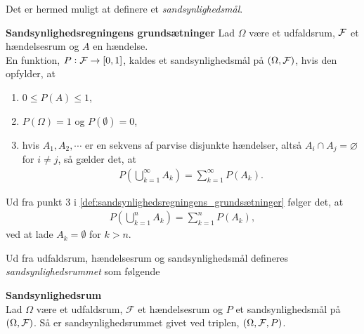 Det er hermed muligt at definere et \textit{sandsynlighedsmål}.

\begin{defn}\textbf{Sandsynlighedsregningens grundsætninger} \label{def:sandsynlighedsregningens_grundsætninger}%
\newline
Lad $\Omega$ være et udfaldsrum, $\mathcal{F}$ et hændelsesrum og $A$ en hændelse.\\
En funktion, $P: \mathcal{F} \to [0,1]$, kaldes et sandsynlighedsmål på $(\Omega, \mathcal{F})$, hvis den opfylder, at
\begin{enumerate}
    \item $0 \leq P(A) \leq 1$,
    \item $P(\Omega) = 1$ og $P(\emptyset)=0$,
    \item hvis $A_1, A_2, \cdots $ er en sekvens af parvise disjunkte hændelser, altså $A_i \cap A_j = \varnothing$ for $i \neq j$, så gælder det, at
    \begin{align*}
        P\left(\bigcup_{k=1}^\infty A_k \right) = \sum_{k=1}^\infty P(A_k).
    \end{align*}
\end{enumerate}

\end{defn}
Ud fra punkt 3 i \autoref{def:sandsynlighedsregningens_grundsætninger} følger det, at
\begin{align*}
    P\left(\bigcup_{k=1}^n A_k \right) = \sum_{k=1}^n P(A_k),
\end{align*}
ved at lade $A_k = \emptyset$ for $k > n$.

Ud fra udfaldsrum, hændelsesrum og sandsynlighedsmål defineres \textit{sandsynlighedsrummet} som følgende

\begin{minipage}\textwidth
\begin{defn}\textbf{Sandsynlighedsrum} \label{def:sandsynlighedsrum}\\
    Lad $\Omega$ være et udfaldsrum, $\mathcal{F}$ et hændelsesrum og $P$ et sandsynlighedsmål på $(\Omega, \mathcal{F})$. Så er sandsynlighedsrummet givet ved triplen, $(\Omega, \mathcal{F}, P)$. 
\end{defn}
\end{minipage}



